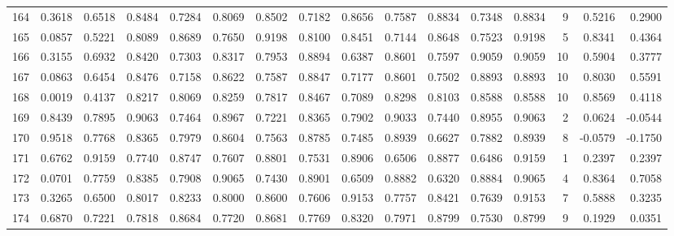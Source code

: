 \begin{tabular}{lrrrrrrrrrrrrrrr}
164 &      0.3618 &  0.6518 &  0.8484 &  0.7284 &  0.8069 &  0.8502 &  0.7182 &  0.8656 &  0.7587 &  0.8834 &   0.7348 &     0.8834 &      9 &                    0.5216 &                     0.2900 \\
165 &      0.0857 &  0.5221 &  0.8089 &  0.8689 &  0.7650 &  0.9198 &  0.8100 &  0.8451 &  0.7144 &  0.8648 &   0.7523 &     0.9198 &      5 &                    0.8341 &                     0.4364 \\
166 &      0.3155 &  0.6932 &  0.8420 &  0.7303 &  0.8317 &  0.7953 &  0.8894 &  0.6387 &  0.8601 &  0.7597 &   0.9059 &     0.9059 &     10 &                    0.5904 &                     0.3777 \\
167 &      0.0863 &  0.6454 &  0.8476 &  0.7158 &  0.8622 &  0.7587 &  0.8847 &  0.7177 &  0.8601 &  0.7502 &   0.8893 &     0.8893 &     10 &                    0.8030 &                     0.5591 \\
168 &      0.0019 &  0.4137 &  0.8217 &  0.8069 &  0.8259 &  0.7817 &  0.8467 &  0.7089 &  0.8298 &  0.8103 &   0.8588 &     0.8588 &     10 &                    0.8569 &                     0.4118 \\
169 &      0.8439 &  0.7895 &  0.9063 &  0.7464 &  0.8967 &  0.7221 &  0.8365 &  0.7902 &  0.9033 &  0.7440 &   0.8955 &     0.9063 &      2 &                    0.0624 &                    -0.0544 \\
170 &      0.9518 &  0.7768 &  0.8365 &  0.7979 &  0.8604 &  0.7563 &  0.8785 &  0.7485 &  0.8939 &  0.6627 &   0.7882 &     0.8939 &      8 &                   -0.0579 &                    -0.1750 \\
171 &      0.6762 &  0.9159 &  0.7740 &  0.8747 &  0.7607 &  0.8801 &  0.7531 &  0.8906 &  0.6506 &  0.8877 &   0.6486 &     0.9159 &      1 &                    0.2397 &                     0.2397 \\
172 &      0.0701 &  0.7759 &  0.8385 &  0.7908 &  0.9065 &  0.7430 &  0.8901 &  0.6509 &  0.8882 &  0.6320 &   0.8884 &     0.9065 &      4 &                    0.8364 &                     0.7058 \\
173 &      0.3265 &  0.6500 &  0.8017 &  0.8233 &  0.8000 &  0.8600 &  0.7606 &  0.9153 &  0.7757 &  0.8421 &   0.7639 &     0.9153 &      7 &                    0.5888 &                     0.3235 \\
174 &      0.6870 &  0.7221 &  0.7818 &  0.8684 &  0.7720 &  0.8681 &  0.7769 &  0.8320 &  0.7971 &  0.8799 &   0.7530 &     0.8799 &      9 &                    0.1929 &                     0.0351 \\

\end{tabular}

